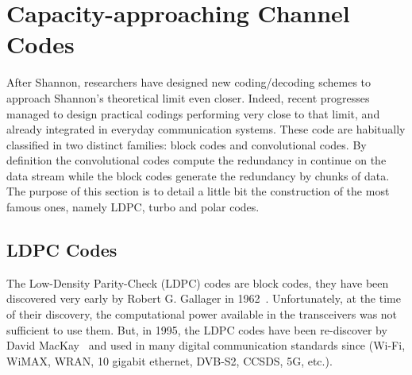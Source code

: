 \section{Capacity-approaching Channel Codes}

After Shannon, researchers have designed new coding/decoding schemes to approach
Shannon's theoretical limit even closer. Indeed, recent progresses managed to
design practical codings performing very close to that limit, and already
integrated in everyday communication systems. These code are habitually
classified in two distinct families: block codes and convolutional codes. By
definition the convolutional codes compute the redundancy in continue on the
data stream while the block codes generate the redundancy by chunks of data.
The purpose of this section is to detail a little bit the construction of the
most famous ones, namely LDPC, turbo and polar codes.

\subsection{LDPC Codes}

The Low-Density Parity-Check (LDPC) codes are block codes, they have been
discovered very early by Robert G. Gallager in 1962~\cite{Gallager1962}.
Unfortunately, at the time of their discovery, the computational power available
in the transceivers was not sufficient to use them. But, in 1995, the LDPC codes
have been re-discover by David MacKay~\cite{MacKay1995} and used in many digital
communication standards since (Wi-Fi, WiMAX, WRAN, 10 gigabit ethernet, DVB-S2,
CCSDS, 5G, etc.).

